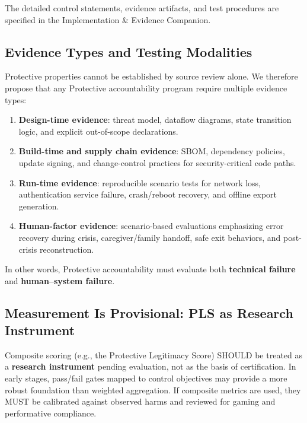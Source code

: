 \documentclass[12pt]{article}
\begin{document}
The detailed control statements, evidence artifacts, and test procedures are specified in the Implementation \& Evidence Companion.

\subsection{Evidence Types and Testing Modalities}
Protective properties cannot be established by source review alone. We therefore propose that any Protective accountability program require multiple evidence types:
\begin{enumerate}
\item \textbf{Design-time evidence}: threat model, dataflow diagrams, state transition logic, and explicit out-of-scope declarations.
\item \textbf{Build-time and supply chain evidence}: SBOM, dependency policies, update signing, and change-control practices for security-critical code paths.
\item \textbf{Run-time evidence}: reproducible scenario tests for network loss, authentication service failure, crash/reboot recovery, and offline export generation.
\item \textbf{Human-factor evidence}: scenario-based evaluations emphasizing error recovery during crisis, caregiver/family handoff, safe exit behaviors, and post-crisis reconstruction.
\end{enumerate}

In other words, Protective accountability must evaluate both \textbf{technical failure} and \textbf{human--system failure}.

\subsection{Measurement Is Provisional: PLS as Research Instrument}
Composite scoring (e.g., the Protective Legitimacy Score) SHOULD be treated as a \textbf{research instrument} pending evaluation, not as the basis of certification. In early stages, pass/fail gates mapped to control objectives may provide a more robust foundation than weighted aggregation. If composite metrics are used, they MUST be calibrated against observed harms and reviewed for gaming and performative compliance.
\end{document}

